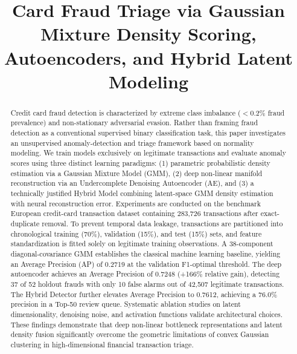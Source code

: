 \documentclass[conference]{IEEEtran}
\begin{document}
\title{Card Fraud Triage via Gaussian Mixture Density Scoring, Autoencoders, and Hybrid Latent Modeling}

\author{
}

\maketitle

\begin{abstract}
Credit card fraud detection is characterized by extreme class imbalance ($<0.2\%$ fraud prevalence) and non-stationary adversarial evasion. Rather than framing fraud detection as a conventional supervised binary classification task, this paper investigates an unsupervised anomaly-detection and triage framework based on normality modeling. We train models exclusively on legitimate transactions and evaluate anomaly scores using three distinct learning paradigms: (1) parametric probabilistic density estimation via a Gaussian Mixture Model (GMM), (2) deep non-linear manifold reconstruction via an Undercomplete Denoising Autoencoder (AE), and (3) a technically justified Hybrid Model combining latent-space GMM density estimation with neural reconstruction error. Experiments are conducted on the benchmark European credit-card transaction dataset containing 283,726 transactions after exact-duplicate removal. To prevent temporal data leakage, transactions are partitioned into chronological training (70\%), validation (15\%), and test (15\%) sets, and feature standardization is fitted solely on legitimate training observations. A 38-component diagonal-covariance GMM establishes the classical machine learning baseline, yielding an Average Precision (AP) of 0.2719 at the validation F1-optimal threshold. The deep autoencoder achieves an Average Precision of 0.7248 (+166\% relative gain), detecting 37 of 52 holdout frauds with only 10 false alarms out of 42,507 legitimate transactions. The Hybrid Detector further elevates Average Precision to 0.7612, achieving a 76.0\% precision in a Top-50 review queue. Systematic ablation studies on latent dimensionality, denoising noise, and activation functions validate architectural choices. These findings demonstrate that deep non-linear bottleneck representations and latent density fusion significantly overcome the geometric limitations of convex Gaussian clustering in high-dimensional financial transaction triage.
\end{abstract}
\end{document}
